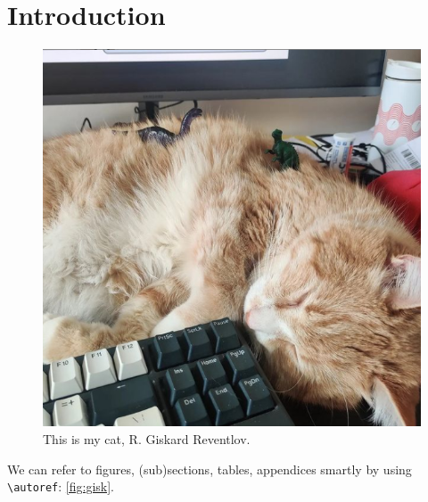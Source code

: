 \section{Introduction}
\label{sec:intro}


\begin{figure}[h]
  \centering
  \includegraphics[width=.8\linewidth]{figures/gisk.PNG}
  \caption{This is my cat, R. Giskard Reventlov.}
  \label{fig:gisk}
\end{figure}


We can refer to figures, (sub)sections, tables, appendices smartly by using \texttt{\textbackslash autoref}: \autoref{fig:gisk}.